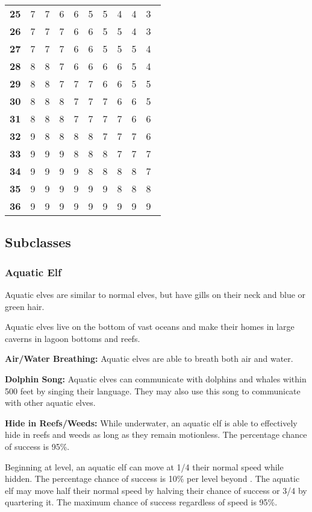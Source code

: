 \begin{multicols*}{2}
\begin {table}[H]
\begin{tabularx}{\columnwidth}{>{\bfseries}YYYYYYYYYY}
		25 & 7 & 7 & 6 & 6 & 5 & 5 & 4 & 4 & 3\\
		26 & 7 & 7 & 7 & 6 & 6 & 5 & 5 & 4 & 3\\
		27 & 7 & 7 & 7 & 6 & 6 & 5 & 5 & 5 & 4\\
		28 & 8 & 8 & 7 & 6 & 6 & 6 & 6 & 5 & 4\\
		29 & 8 & 8 & 7 & 7 & 7 & 6 & 6 & 5 & 5\\
		30 & 8 & 8 & 8 & 7 & 7 & 7 & 6 & 6 & 5\\
		31 & 8 & 8 & 8 & 7 & 7 & 7 & 7 & 6 & 6\\
		32 & 9 & 8 & 8 & 8 & 8 & 7 & 7 & 7 & 6\\
		33 & 9 & 9 & 9 & 8 & 8 & 8 & 7 & 7 & 7\\
		34 & 9 & 9 & 9 & 9 & 8 & 8 & 8 & 8 & 7\\
		35 & 9 & 9 & 9 & 9 & 9 & 9 & 8 & 8 & 8\\
		36 & 9 & 9 & 9 & 9 & 9 & 9 & 9 & 9 & 9\
  \end {tabularx}
\end {table}

\subsection{Subclasses}
\subsubsection{Aquatic Elf}
Aquatic elves are similar to normal elves, but have gills on their neck and blue or green hair.

Aquatic elves live on the bottom of vast oceans and make their homes in large caverns in lagoon bottoms and reefs.

\textbf{Air/Water Breathing:} Aquatic elves are able to breath both air and water.

\textbf{Dolphin Song:} Aquatic elves can communicate with dolphins and whales within 500 feet by singing their language. They may also use this song to communicate with other aquatic elves.

\textbf{Hide in Reefs/Weeds:} While underwater, an aquatic elf is able to effectively hide in reefs and weeds as long as they remain motionless. The percentage chance of success is 95\%.

Beginning at  level, an aquatic elf can move at 1/4 their normal speed while hidden. The percentage chance of success is 10\% per level beyond . The aquatic elf may move half their normal speed by halving their chance of success or 3/4 by quartering it. The maximum chance of success regardless of speed is 95\%.


\end{multicols*}
